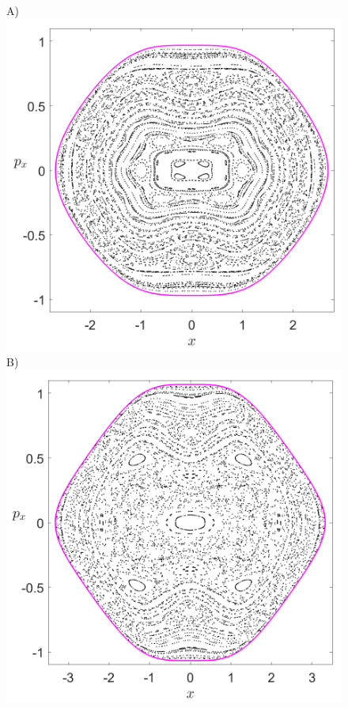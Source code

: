 \documentclass[10pt,aps,onecolumn,superscriptaddress]{revtex4-2}
\begin{document}
%
%
\begin{figure}[htbp]
	A)\includegraphics[scale=0.3]{PS_cirque_H_-0_2_y_0_w0_1div2_d_1_k_sqrt7.png}
	B)\includegraphics[scale=0.3]{PS_cirque_H_-0_1_y_0_w0_1div2_d_1_k_sqrt7.png}	

\end{figure}
\end{document}
